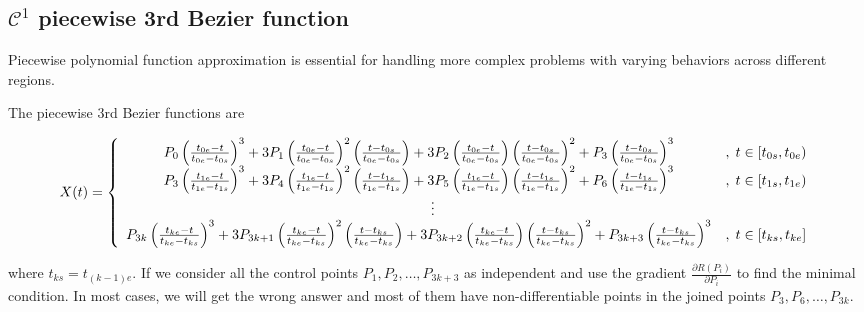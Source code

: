 \documentclass[12pt]{article}
\begin{document}
\subsection{$\mathcal{C}^1$ piecewise 3rd Bezier function}


Piecewise polynomial function approximation is essential for handling more complex problems with varying behaviors across different regions.

The piecewise 3rd Bezier functions are 
%
\begin{footnotesize}
	\begin{align*}
		X(t) = \left\{ \begin{array}{c l}
			P_{0} \left( \frac{t_{0e}-t}{t_{0e}-t_{0s}} \right)^3 + 3 P_{1} \left( \frac{t_{0e}-t}{t_{0e}-t_{0s}} \right)^2 \left( \frac{t-t_{0s}}{t_{0e}-t_{0s}} \right) + 3 P_{2} \left( \frac{t_{0e}-t}{t_{0e}-t_{0s}} \right) \left( \frac{t-t_{0s}}{t_{0e}-t_{0s}} \right)^2 + P_{3} \left( \frac{t-t_{0s}}{t_{0e}-t_{0s}} \right)^3 &, \; t\in [t_{0s}, t_{0e}) \\
			P_{3} \left( \frac{t_{1e}-t}{t_{1e}-t_{1s}} \right)^3 + 3 P_{4} \left( \frac{t_{1e}-t}{t_{1e}-t_{1s}} \right)^2 \left( \frac{t-t_{1s}}{t_{1e}-t_{1s}} \right) + 3 P_{5} \left( \frac{t_{1e}-t}{t_{1e}-t_{1s}} \right) \left( \frac{t-t_{1s}}{t_{1e}-t_{1s}} \right)^2 + P_{6} \left( \frac{t-t_{1s}}{t_{1e}-t_{1s}} \right)^3 &, \; t\in [t_{1s}, t_{1e}) \\
			\qquad \vdots \\
			P_{3k} \left( \frac{t_{ke}-t}{t_{ke}-t_{ks}} \right)^3 + 3 P_{3k+1} \left( \frac{t_{ke}-t}{t_{ke}-t_{ks}} \right)^2 \left( \frac{t-t_{ks}}{t_{ke}-t_{ks}} \right) + 3 P_{3k+2} \left( \frac{t_{ke}-t}{t_{ke}-t_{ks}} \right) \left( \frac{t-t_{ks}}{t_{ke}-t_{ks}} \right)^2 + P_{3k+3} \left( \frac{t-t_{ks}}{t_{ke}-t_{ks}} \right)^3 &, \; t\in [t_{ks}, t_{ke}] \\
		\end{array} \right.
	\end{align*}
\end{footnotesize}
%
where $t_{ks}=t_{(k-1)e}$.
If we consider all the control points $P_1,P_2,\dots, P_{3k+3}$ as independent and use the gradient $\frac{\partial R(P_i)}{\partial P_i}$ to find the minimal condition.
In most cases, we will get the wrong answer and most of them have non-differentiable points in the joined points $P_3, P_6, \dots, P_{3k}$.
\end{document}
